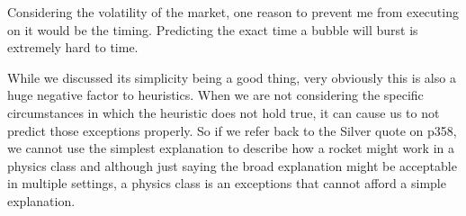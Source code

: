 \documentclass[12pt]{article}
\begin{document}
\begin{enumerate}

Considering the volatility of the market, one reason to prevent me from executing on it would be the timing. Predicting the exact time a bubble will burst is extremely hard to time.


While we discussed its simplicity being a good thing, very obviously this is also a huge negative factor to heuristics. When we are not considering the specific circumstances in which the heuristic does not hold true, it can cause us to not predict those exceptions properly. So if we refer back to the Silver quote on p358, we cannot use the simplest explanation to describe how a rocket might work in a physics class and although just saying the broad explanation might be acceptable in multiple settings, a physics class is an exceptions that cannot afford a simple explanation. 
\end{enumerate}


\end{document}
